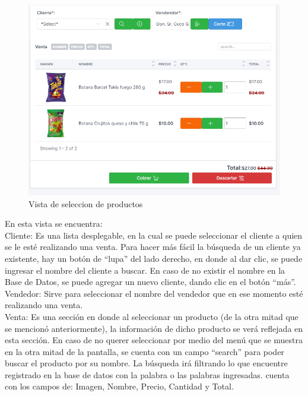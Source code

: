 \documentclass[a4paper,DIV=12]{scrreprt}
\begin{document}
	\begin{figure}[!htb]
		\centering
		\includegraphics[scale=0.4]{VENTAS2.PNG}
		\caption{Vista de seleccion de productos}
	\end{figure}
	\clearpage
	En esta vista se encuentra: \\
	Cliente: Es una lista desplegable, en la cual se puede seleccionar el cliente a quien se le esté realizando una venta. Para hacer más fácil la búsqueda de un cliente ya existente, hay un botón de “lupa” del lado derecho, en donde al dar clic, se puede ingresar el nombre del cliente a buscar. En caso de no existir el nombre en la Base de Datos, se puede agregar un nuevo cliente, dando clic en el botón “más”.\\
	
     Vendedor: Sirve para seleccionar el nombre del vendedor que en ese momento esté realizando una venta.\\
  
    Venta: Es una sección en donde al seleccionar un producto (de la otra mitad que se mencionó anteriormente), la información de dicho producto se verá reflejada en esta sección. En caso de no querer seleccionar por medio del menú que se muestra en la otra mitad de la pantalla, se cuenta con un campo “search” para poder buscar el producto por su nombre. La búsqueda irá filtrando lo que encuentre registrado en la base de datos con la palabra o las palabras ingresadas. cuenta con los campos de: Imagen, Nombre, Precio, Cantidad y Total.\\
\end{document}

